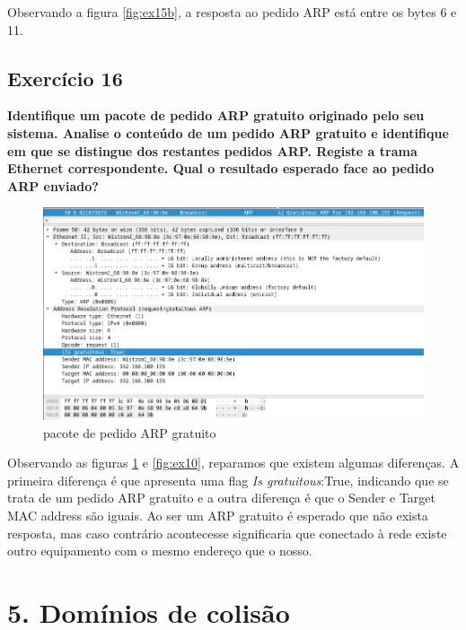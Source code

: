 \documentclass[a4paper]{report}
\begin{document}
Observando a figura \ref{fig:ex15b}, a resposta ao pedido ARP está entre os bytes 6 e 11.

\section{Exercício 16}
\textbf{Identifique um pacote de pedido ARP gratuito originado pelo seu sistema.
Analise o conteúdo de um pedido ARP gratuito e identifique em que se distingue
dos restantes pedidos ARP. Registe a trama Ethernet correspondente. Qual o
resultado esperado face ao pedido ARP enviado?}

\begin{figure}[H]
    \centering 
    \includegraphics[width=\textwidth]{images/ex16.png}
    \caption{pacote de pedido ARP gratuito}
    \label{fig:ex16}
\end{figure}

Observando as figuras \ref{fig:ex16} e \ref{fig:ex10}, reparamos que existem algumas
diferenças. A primeira diferença é que apresenta uma flag \textit{Is gratuitous}:True,
indicando que se trata de um pedido ARP gratuito e a outra diferença é que o Sender e 
Target MAC address são iguais. Ao ser um ARP gratuito é esperado que não exista resposta,
mas caso contrário acontecesse significaria que conectado à rede existe outro equipamento
com o mesmo endereço que o nosso.

\chapter{5. Domínios de colisão}
\end{document}
